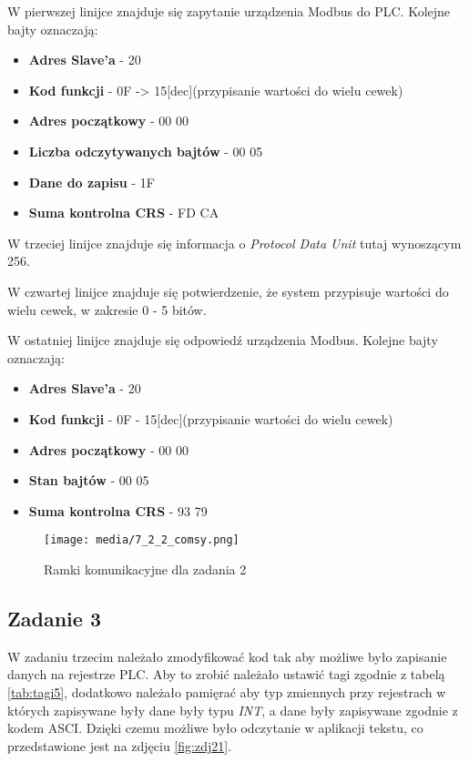 \documentclass{article}
\begin{document}
W pierwszej linijce znajduje się zapytanie urządzenia Modbus do PLC. Kolejne bajty oznaczają:
\begin{itemize}
    \item \textbf{Adres Slave'a} - 20
    \item \textbf{Kod funkcji} - 0F -> 15[dec](przypisanie wartości do wielu cewek)
    \item \textbf{Adres początkowy} - 00 00
    \item \textbf{Liczba odczytywanych bajtów} - 00 05
    \item \textbf{Dane do zapisu} - 1F
    \item \textbf{Suma kontrolna CRS} - FD CA
\end{itemize}

W trzeciej linijce znajduje się informacja o \textit{Protocol Data Unit} tutaj wynoszącym 256.

W czwartej linijce znajduje się potwierdzenie, że system przypisuje wartości do wielu cewek, w zakresie 0 - 5 bitów.

W ostatniej linijce znajduje się odpowiedź urządzenia Modbus. Kolejne bajty oznaczają:
\begin{itemize}
    \item \textbf{Adres Slave'a} - 20
    \item \textbf{Kod funkcji} - 0F - 15[dec](przypisanie wartości do wielu cewek)
    \item \textbf{Adres początkowy} - 00 00 
    \item \textbf{Stan bajtów} - 00 05
    \item \textbf{Suma kontrolna CRS} - 93 79
\end{itemize}


\begin{figure}[H]
    \centering
    \texttt{[image: media/7\_2\_2\_comsy.png]}
    \caption{Ramki komunikacyjne dla zadania 2}
    \label{fig:zdj20}
\end{figure}

\newpage
\subsection{Zadanie 3}
W zadaniu trzecim należało zmodyfikować kod tak aby możliwe było zapisanie danych na rejestrze PLC. Aby to zrobić należało ustawić tagi zgodnie z tabelą \ref{tab:tagi5}, dodatkowo należało pamięrać aby typ zmiennych przy rejestrach w których zapisywane były dane były typu \textit{INT}, a dane były zapisywane zgodnie z kodem ASCI. Dzięki czemu możliwe było odczytanie w aplikacji tekstu, co przedstawione jest na zdjęciu \ref{fig:zdj21}.
\end{document}
